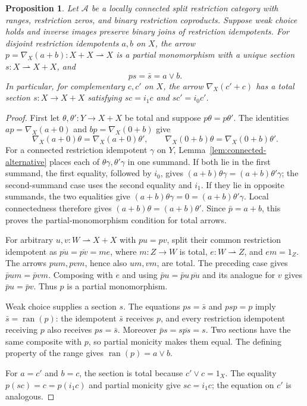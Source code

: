 \documentclass[11pt]{article}
\newtheorem{proposition}[theorem]{Proposition}
\newcommand{\ran}{\operatorname{ran}}
\begin{document}
\begin{proposition}\label{prop:local-switch}
Let $\mathcal A$ be a locally connected split restriction category with
ranges, restriction zeros, and binary restriction coproducts. Suppose
weak choice holds and inverse images preserve binary joins of
restriction idempotents.
For disjoint restriction idempotents $a,b$ on $X$, the arrow
$p=\nabla_X(a+b):X+X\rightharpoonup X$ is a partial monomorphism
with a unique section $s:X\rightharpoonup X+X$, and
\[
 ps=\bar s=a\vee b.
\]
In particular, for complementary $c,c'$ on $X$, the arrow
$\nabla_X(c'+c)$ has a total section $s:X\to X+X$ satisfying
$sc=i_1c$ and $sc'=i_0c'$.
\end{proposition}
\begin{proof}
First let $\theta,\theta':Y\to X+X$ be total and suppose
$p\theta=p\theta'$. The identities
$ap=\nabla_X(a+0)$ and $bp=\nabla_X(0+b)$ give
\[
 \nabla_X(a+0)\theta=\nabla_X(a+0)\theta',
 \qquad
 \nabla_X(0+b)\theta=\nabla_X(0+b)\theta'.
\]
For a connected restriction idempotent $\gamma$ on $Y$,
Lemma~\ref{lem:connected-alternative} places each of
$\theta\gamma,\theta'\gamma$ in one summand.
If both lie in the first summand, the first equality, followed by $i_0$,
gives $(a+b)\theta\gamma=(a+b)\theta'\gamma$; the second-summand
case uses the second equality and $i_1$.
If they lie in opposite summands, the two equalities give
$(a+b)\theta\gamma=0=(a+b)\theta'\gamma$.
Local connectedness therefore gives
$(a+b)\theta=(a+b)\theta'$. Since $\bar p=a+b$, this proves the
partial-monomorphism condition for total arrows.

For arbitrary $u,v:W\rightharpoonup X+X$ with $pu=pv$, split their
common restriction idempotent as
$\overline{pu}=\overline{pv}=me$, where $m:Z\to W$ is total,
$e:W\rightharpoonup Z$, and $em=1_Z$. The arrows $pum,pvm$, hence also $um,vm$, are total.
The preceding case gives $\bar p um=\bar p vm$. Composing with $e$
and using $\bar p u=\bar p u\,\overline{pu}$ and its analogue for $v$
gives $\bar p u=\bar p v$. Thus $p$ is a partial monomorphism.

Weak choice supplies a section $s$. The equations $ps=\bar s$ and
$psp=p$ imply $\bar s=\ran(p)$: the idempotent $\bar s$ receives $p$,
and every restriction idempotent receiving $p$ also receives
$ps=\bar s$. Moreover
$\bar p s=s\overline{ps}=s$. Two sections have the same composite
with $p$, so partial monicity makes them equal.
The defining property of the range gives $\ran(p)=a\vee b$.

For $a=c'$ and $b=c$, the section is total because $c'\vee c=1_X$.
The equality $p(sc)=c=p(i_1c)$ and partial monicity give $sc=i_1c$;
the equation on $c'$ is analogous.
\end{proof}
\end{document}
